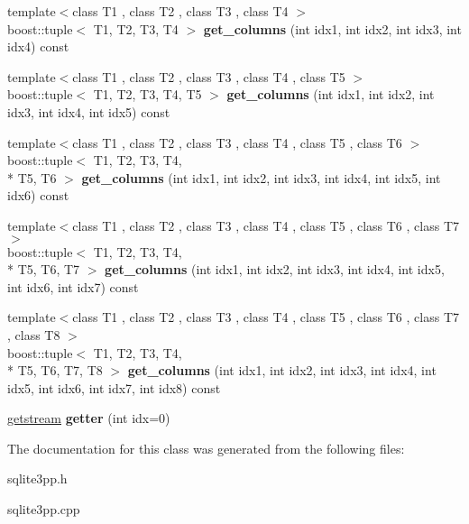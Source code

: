 \begin{DoxyCompactItemize}
\item 
\hypertarget{classsqlite3pp_1_1query_1_1rows_aacde59252afbe52db88a3705f9c2a1ca}{{\footnotesize template$<$class T1 , class T2 , class T3 , class T4 $>$ }\\boost\-::tuple$<$ T1, T2, T3, T4 $>$ {\bfseries get\-\_\-columns} (int idx1, int idx2, int idx3, int idx4) const }\label{classsqlite3pp_1_1query_1_1rows_aacde59252afbe52db88a3705f9c2a1ca}

\item 
\hypertarget{classsqlite3pp_1_1query_1_1rows_ab5b41378853b226af9232d795c29d914}{{\footnotesize template$<$class T1 , class T2 , class T3 , class T4 , class T5 $>$ }\\boost\-::tuple$<$ T1, T2, T3, T4, T5 $>$ {\bfseries get\-\_\-columns} (int idx1, int idx2, int idx3, int idx4, int idx5) const }\label{classsqlite3pp_1_1query_1_1rows_ab5b41378853b226af9232d795c29d914}

\item 
\hypertarget{classsqlite3pp_1_1query_1_1rows_aa8cbb31728dc1140b61fa5223f47c1e7}{{\footnotesize template$<$class T1 , class T2 , class T3 , class T4 , class T5 , class T6 $>$ }\\boost\-::tuple$<$ T1, T2, T3, T4, \\*
T5, T6 $>$ {\bfseries get\-\_\-columns} (int idx1, int idx2, int idx3, int idx4, int idx5, int idx6) const }\label{classsqlite3pp_1_1query_1_1rows_aa8cbb31728dc1140b61fa5223f47c1e7}

\item 
\hypertarget{classsqlite3pp_1_1query_1_1rows_a5d8a09258cdaf11a84fa6aba00061c9c}{{\footnotesize template$<$class T1 , class T2 , class T3 , class T4 , class T5 , class T6 , class T7 $>$ }\\boost\-::tuple$<$ T1, T2, T3, T4, \\*
T5, T6, T7 $>$ {\bfseries get\-\_\-columns} (int idx1, int idx2, int idx3, int idx4, int idx5, int idx6, int idx7) const }\label{classsqlite3pp_1_1query_1_1rows_a5d8a09258cdaf11a84fa6aba00061c9c}

\item 
\hypertarget{classsqlite3pp_1_1query_1_1rows_ae2d0a357149b380cb4b756489ea7c285}{{\footnotesize template$<$class T1 , class T2 , class T3 , class T4 , class T5 , class T6 , class T7 , class T8 $>$ }\\boost\-::tuple$<$ T1, T2, T3, T4, \\*
T5, T6, T7, T8 $>$ {\bfseries get\-\_\-columns} (int idx1, int idx2, int idx3, int idx4, int idx5, int idx6, int idx7, int idx8) const }\label{classsqlite3pp_1_1query_1_1rows_ae2d0a357149b380cb4b756489ea7c285}

\item 
\hypertarget{classsqlite3pp_1_1query_1_1rows_a0b3882a05309d4adaa5a87410e82025a}{\hyperlink{classsqlite3pp_1_1query_1_1rows_1_1getstream}{getstream} {\bfseries getter} (int idx=0)}\label{classsqlite3pp_1_1query_1_1rows_a0b3882a05309d4adaa5a87410e82025a}

\end{DoxyCompactItemize}


The documentation for this class was generated from the following files\-:\begin{DoxyCompactItemize}
\item 
sqlite3pp.\-h\item 
sqlite3pp.\-cpp\end{DoxyCompactItemize}
